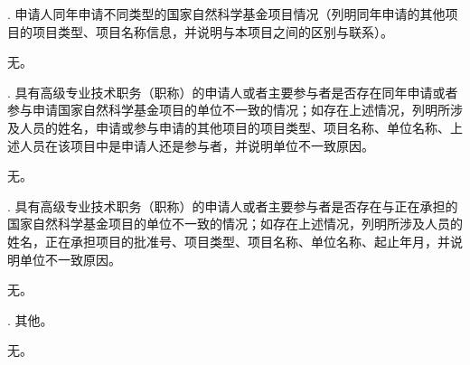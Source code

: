 \documentclass[12pt,UTF8,AutoFakeBold,a4paper]{ctexart} %
\newcommand{\sihao}{\fontsize{14pt}{\baselineskip}\selectfont}
\begin{document}
{\sihao \color{MsBlue} . 申请人同年申请不同类型的国家自然科学基金项目情况（列明同年申请的其他项目的项目类型、项目名称信息，并说明与本项目之间的区别与联系）。 }

无。

{\sihao \color{MsBlue} . 具有高级专业技术职务（职称）的申请人或者主要参与者是否存在同年申请或者参与申请国家自然科学基金项目的单位不一致的情况；如存在上述情况，列明所涉及人员的姓名，申请或参与申请的其他项目的项目类型、项目名称、单位名称、上述人员在该项目中是申请人还是参与者，并说明单位不一致原因。}

无。

{\sihao \color{MsBlue} . 具有高级专业技术职务（职称）的申请人或者主要参与者是否存在与正在承担的国家自然科学基金项目的单位不一致的情况；如存在上述情况，列明所涉及人员的姓名，正在承担项目的批准号、项目类型、项目名称、单位名称、起止年月，并说明单位不一致原因。}

无。

{\sihao \color{MsBlue} . 其他。}

无。
\end{document}
